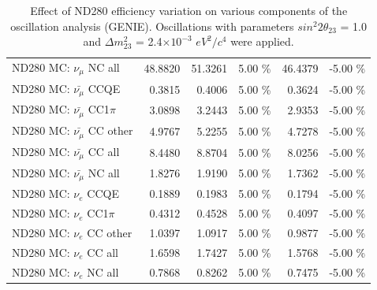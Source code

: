 \begin{table}
\begin{tabular}{| l | r | r  r | r  r |}
                                          ND280 MC: $\nu_{\mu}$ NC all &         48.8820 &         51.3261 &  5.00 \%  &         46.4379 & -5.00 \%  \\ 
                                      ND280 MC: $\bar{\nu_{\mu}}$ CCQE &          0.3815 &          0.4006 &  5.00 \%  &          0.3624 & -5.00 \%  \\ 
                                  ND280 MC: $\bar{\nu_{\mu}}$ CC1$\pi$ &          3.0898 &          3.2443 &  5.00 \%  &          2.9353 & -5.00 \%  \\ 
                                  ND280 MC: $\bar{\nu_{\mu}}$ CC other &          4.9767 &          5.2255 &  5.00 \%  &          4.7278 & -5.00 \%  \\ 
                                    ND280 MC: $\bar{\nu_{\mu}}$ CC all &          8.4480 &          8.8704 &  5.00 \%  &          8.0256 & -5.00 \%  \\ 
                                    ND280 MC: $\bar{\nu_{\mu}}$ NC all &          1.8276 &          1.9190 &  5.00 \%  &          1.7362 & -5.00 \%  \\ 
                                              ND280 MC: $\nu_{e}$ CCQE &          0.1889 &          0.1983 &  5.00 \%  &          0.1794 & -5.00 \%  \\ 
                                          ND280 MC: $\nu_{e}$ CC1$\pi$ &          0.4312 &          0.4528 &  5.00 \%  &          0.4097 & -5.00 \%  \\ 
                                          ND280 MC: $\nu_{e}$ CC other &          1.0397 &          1.0917 &  5.00 \%  &          0.9877 & -5.00 \%  \\ 
                                            ND280 MC: $\nu_{e}$ CC all &          1.6598 &          1.7427 &  5.00 \%  &          1.5768 & -5.00 \%  \\ 
                                            ND280 MC: $\nu_{e}$ NC all &          0.7868 &          0.8262 &  5.00 \%  &          0.7475 & -5.00 \%  \\ 
\hline
\end{tabular}
\caption{ 
  Effect of ND280 efficiency variation
  on various components of the oscillation analysis (GENIE).
  Oscillations with parameters $sin^{2}2\theta_{23}$ = 1.0 and $\Delta m^{2}_{23}$ = 2.4$\times10^{-3}$ $eV^{2}/c^{4}$ were applied.  
}
\label{tab:genie_nd280_eff}
\end{table}


%
%
%
%

